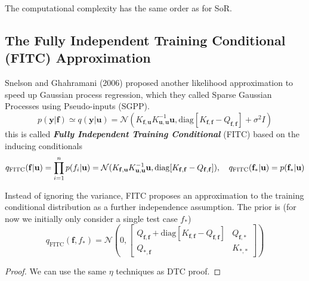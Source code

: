 \documentclass[10pt]{elegantbook}
\newcommand{\mydefination}[1]{\textbf{\textit{\textcolor{structurecolor}{#1}}}}
\begin{document}
The computational complexity has the same order as for SoR.

\subsection{The Fully Independent Training Conditional (FITC) Approximation}
Snelson and Ghahramani (2006) proposed another likelihood approximation to speed up
Gaussian process regression, which they called Sparse Gaussian Processes using Pseudo-inputs
(SGPP).
\begin{equation}
    p(\mathbf y | \mathbf f) \simeq q(\mathbf y | \mathbf u) = \mathcal N \left ( 
        K_{\mathbf f, \mathbf u} K_{\mathbf u, \mathbf u}^{-1} \mathbf u, 
        \mathrm{diag} [K_{\mathbf f, \mathbf f} - Q_{\mathbf f, \mathbf f}] + \sigma^2 I
         \right )
\end{equation}
this is called \mydefination{Fully Independent Training Conditional} (FITC) based on the inducing conditionals
\begin{equation}
    q_{\mathrm{FITC}}(\mathbf{f|u})
    = \prod_{i=1}^{n} p(f_i | \mathbf u)
    =\mathcal{N}(K_{\mathbf{f,u}}K_{\mathbf{u,u}}^{-1}{\bf u}, \mathrm{diag} [K_{\mathbf f, \mathbf f} - Q_{\mathbf f, \mathbf f}]),
    \quad q_{\mathrm{FITC}}(\mathbf{f_{*}}|{\bf u})=p(\mathbf{f_{*}}|{\bf u})
\end{equation}

Instead of ignoring the variance, FITC proposes an approximation to the training conditional
distribution as a further independence assumption. The prior is (for now we initially only consider a single test case $f_*$)
\begin{equation}
    q_{\text{FITC}}(\mathbf f, f_*) = \mathcal N \left ( 0, \begin{bmatrix}
        Q_{\mathbf f, \mathbf f} + \mathrm{diag} [K_{\mathbf f, \mathbf f} - Q_{\mathbf f, \mathbf f}] & Q_{\mathbf f, *} \\
        Q_{*, \mathbf f} & K_{*, *}
    \end{bmatrix} \right )
\end{equation}

\begin{proof}
    We can use the same $\eta$ techniques as DTC proof.
\end{proof}
\end{document}
